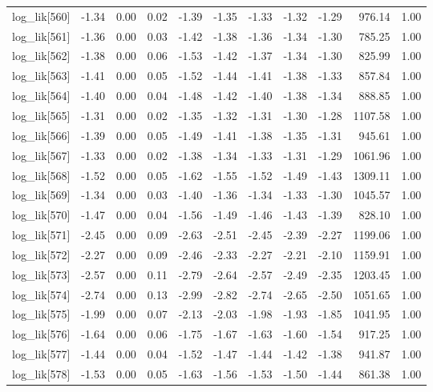 \begin{table}[ht]
\begin{tabular}{rrrrrrrrrrr}
  log\_lik[560] & -1.34 & 0.00 & 0.02 & -1.39 & -1.35 & -1.33 & -1.32 & -1.29 & 976.14 & 1.00 \\ 
  log\_lik[561] & -1.36 & 0.00 & 0.03 & -1.42 & -1.38 & -1.36 & -1.34 & -1.30 & 785.25 & 1.00 \\ 
  log\_lik[562] & -1.38 & 0.00 & 0.06 & -1.53 & -1.42 & -1.37 & -1.34 & -1.30 & 825.99 & 1.00 \\ 
  log\_lik[563] & -1.41 & 0.00 & 0.05 & -1.52 & -1.44 & -1.41 & -1.38 & -1.33 & 857.84 & 1.00 \\ 
  log\_lik[564] & -1.40 & 0.00 & 0.04 & -1.48 & -1.42 & -1.40 & -1.38 & -1.34 & 888.85 & 1.00 \\ 
  log\_lik[565] & -1.31 & 0.00 & 0.02 & -1.35 & -1.32 & -1.31 & -1.30 & -1.28 & 1107.58 & 1.00 \\ 
  log\_lik[566] & -1.39 & 0.00 & 0.05 & -1.49 & -1.41 & -1.38 & -1.35 & -1.31 & 945.61 & 1.00 \\ 
  log\_lik[567] & -1.33 & 0.00 & 0.02 & -1.38 & -1.34 & -1.33 & -1.31 & -1.29 & 1061.96 & 1.00 \\ 
  log\_lik[568] & -1.52 & 0.00 & 0.05 & -1.62 & -1.55 & -1.52 & -1.49 & -1.43 & 1309.11 & 1.00 \\ 
  log\_lik[569] & -1.34 & 0.00 & 0.03 & -1.40 & -1.36 & -1.34 & -1.33 & -1.30 & 1045.57 & 1.00 \\ 
  log\_lik[570] & -1.47 & 0.00 & 0.04 & -1.56 & -1.49 & -1.46 & -1.43 & -1.39 & 828.10 & 1.00 \\ 
  log\_lik[571] & -2.45 & 0.00 & 0.09 & -2.63 & -2.51 & -2.45 & -2.39 & -2.27 & 1199.06 & 1.00 \\ 
  log\_lik[572] & -2.27 & 0.00 & 0.09 & -2.46 & -2.33 & -2.27 & -2.21 & -2.10 & 1159.91 & 1.00 \\ 
  log\_lik[573] & -2.57 & 0.00 & 0.11 & -2.79 & -2.64 & -2.57 & -2.49 & -2.35 & 1203.45 & 1.00 \\ 
  log\_lik[574] & -2.74 & 0.00 & 0.13 & -2.99 & -2.82 & -2.74 & -2.65 & -2.50 & 1051.65 & 1.00 \\ 
  log\_lik[575] & -1.99 & 0.00 & 0.07 & -2.13 & -2.03 & -1.98 & -1.93 & -1.85 & 1041.95 & 1.00 \\ 
  log\_lik[576] & -1.64 & 0.00 & 0.06 & -1.75 & -1.67 & -1.63 & -1.60 & -1.54 & 917.25 & 1.00 \\ 
  log\_lik[577] & -1.44 & 0.00 & 0.04 & -1.52 & -1.47 & -1.44 & -1.42 & -1.38 & 941.87 & 1.00 \\ 
  log\_lik[578] & -1.53 & 0.00 & 0.05 & -1.63 & -1.56 & -1.53 & -1.50 & -1.44 & 861.38 & 1.00 \\ 

\end{tabular}
\end{table}
